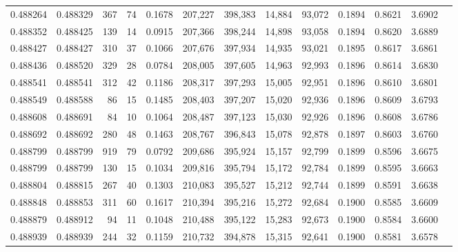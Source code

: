 \begin{tabular}{rrrrrrrrrrrrr}
0.488264 & 0.488329 &   367 &    74 &                                     0.1678 & 207,227 & 398,383 &  14,884 &  93,072 & 0.1894 & 0.8621 & 3.6902 \\
0.488352 & 0.488425 &   139 &    14 &                                     0.0915 & 207,366 & 398,244 &  14,898 &  93,058 & 0.1894 & 0.8620 & 3.6889 \\
0.488427 & 0.488427 &   310 &    37 &                                     0.1066 & 207,676 & 397,934 &  14,935 &  93,021 & 0.1895 & 0.8617 & 3.6861 \\
0.488436 & 0.488520 &   329 &    28 &                                     0.0784 & 208,005 & 397,605 &  14,963 &  92,993 & 0.1896 & 0.8614 & 3.6830 \\
0.488541 & 0.488541 &   312 &    42 &                                     0.1186 & 208,317 & 397,293 &  15,005 &  92,951 & 0.1896 & 0.8610 & 3.6801 \\
0.488549 & 0.488588 &    86 &    15 &                                     0.1485 & 208,403 & 397,207 &  15,020 &  92,936 & 0.1896 & 0.8609 & 3.6793 \\
0.488608 & 0.488691 &    84 &    10 &                                     0.1064 & 208,487 & 397,123 &  15,030 &  92,926 & 0.1896 & 0.8608 & 3.6786 \\
0.488692 & 0.488692 &   280 &    48 &                                     0.1463 & 208,767 & 396,843 &  15,078 &  92,878 & 0.1897 & 0.8603 & 3.6760 \\
0.488799 & 0.488799 &   919 &    79 &                                     0.0792 & 209,686 & 395,924 &  15,157 &  92,799 & 0.1899 & 0.8596 & 3.6675 \\
0.488799 & 0.488799 &   130 &    15 &                                     0.1034 & 209,816 & 395,794 &  15,172 &  92,784 & 0.1899 & 0.8595 & 3.6663 \\
0.488804 & 0.488815 &   267 &    40 &                                     0.1303 & 210,083 & 395,527 &  15,212 &  92,744 & 0.1899 & 0.8591 & 3.6638 \\
0.488848 & 0.488853 &   311 &    60 &                                     0.1617 & 210,394 & 395,216 &  15,272 &  92,684 & 0.1900 & 0.8585 & 3.6609 \\
0.488879 & 0.488912 &    94 &    11 &                                     0.1048 & 210,488 & 395,122 &  15,283 &  92,673 & 0.1900 & 0.8584 & 3.6600 \\
0.488939 & 0.488939 &   244 &    32 &                                     0.1159 & 210,732 & 394,878 &  15,315 &  92,641 & 0.1900 & 0.8581 & 3.6578 \\

\end{tabular}
